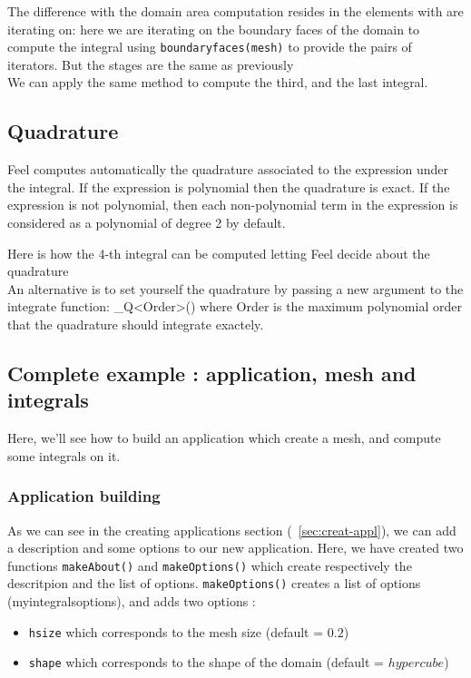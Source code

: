 The difference with the domain area computation resides in the elements with are iterating on: here we are iterating on the boundary faces of the domain to compute the integral using \lstinline!boundaryfaces(mesh)! to provide the pairs of iterators. But the stages are the same as previously \\



We can apply the same method to compute the third, and the last integral. \\

\subsection{Quadrature}

Feel computes automatically the quadrature associated to the expression under the integral. If the expression is polynomial then the quadrature is exact. If the expression is not polynomial, then each non-polynomial term in the expression is considered as a polynomial of degree 2 by default.

Here is how the 4-th integral can be computed letting Feel decide about the quadrature \\


An alternative is to set yourself the quadrature by passing a new argument to the integrate function: \_Q<Order>() where Order is the maximum polynomial order that the quadrature should integrate exactely.


\subsection{Complete example : application, mesh and integrals}

Here, we'll see how to build an application which create a mesh, and compute some integrals on it.

\subsubsection{Application building}
As we can see in the creating applications section (~\ref{sec:creat-appl}), we can add a description and some options to our new application.
Here, we have created two functions \lstinline!makeAbout()! and \lstinline!makeOptions()! which create respectively the descritpion and the list of options.
\lstinline!makeOptions()! creates a list of options (myintegralsoptions), and adds two options :
\begin{itemize}
\item \lstinline!hsize! which corresponds to the mesh size (default = $0.2$)
\item \lstinline!shape! which corresponds to the shape of the domain (default = $hypercube$)
\end{itemize}

